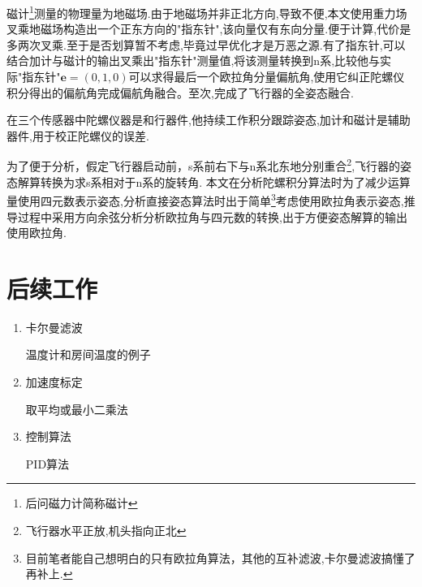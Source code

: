 \documentclass[10pt,a4paper]{article}
\begin{document}
磁计\footnote{后问磁力计简称磁计}测量的物理量为地磁场.由于地磁场并非正北方向,导致不便,本文使用重力场叉乘地磁场构造出一个正东方向的"指东针",该向量仅有东向分量.便于计算,代价是多两次叉乘.至于是否划算暂不考虑,毕竟过早优化才是万恶之源.有了指东针,可以结合加计与磁计的输出叉乘出"指东针"测量值,将该测量转换到n系,比较他与实际"指东针"$\mathbf{e}=(0,1,0)$可以求得最后一个欧拉角分量偏航角,使用它纠正陀螺仪积分得出的偏航角完成偏航角融合。至次,完成了飞行器的全姿态融合.

在三个传感器中陀螺仪器是和行器件,他持续工作积分跟踪姿态,加计和磁计是辅助器件,用于校正陀螺仪的误差.

为了便于分析，假定飞行器启动前，s系前右下与n系北东地分别重合\footnote{飞行器水平正放,机头指向正北},飞行器的姿态解算转换为求s系相对于n系的旋转角. 本文在分析陀螺积分算法时为了减少运算量使用四元数表示姿态,分析直接姿态算法时出于简单\footnote{目前笔者能自己想明白的只有欧拉角算法，其他的互补滤波,卡尔曼滤波搞懂了再补上.}考虑使用欧拉角表示姿态,推导过程中采用方向余弦分析分析欧拉角与四元数的转换,出于方便姿态解算的输出使用欧拉角.





\section{后续工作}
\begin{enumerate}
    \item 卡尔曼滤波

        温度计和房间温度的例子
    \item 加速度标定

        取平均或最小二乘法
    \item 控制算法

        PID算法
\end{enumerate}

\newpage
\renewcommand\refname{参考文献}
\centering %


\end{document}
